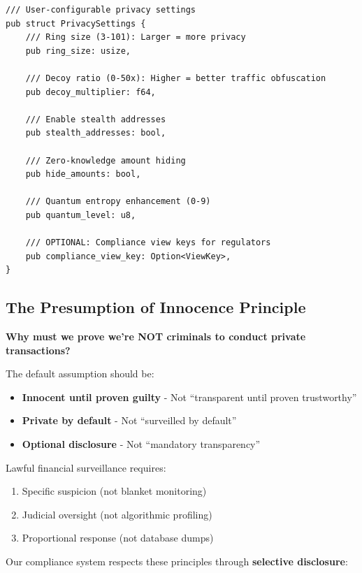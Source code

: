 \documentclass[12pt,a4paper]{article}
\begin{document}
\begin{lstlisting}[style=rustcode, caption=User-Controlled Privacy]
/// User-configurable privacy settings
pub struct PrivacySettings {
    /// Ring size (3-101): Larger = more privacy
    pub ring_size: usize,

    /// Decoy ratio (0-50x): Higher = better traffic obfuscation
    pub decoy_multiplier: f64,

    /// Enable stealth addresses
    pub stealth_addresses: bool,

    /// Zero-knowledge amount hiding
    pub hide_amounts: bool,

    /// Quantum entropy enhancement (0-9)
    pub quantum_level: u8,

    /// OPTIONAL: Compliance view keys for regulators
    pub compliance_view_key: Option<ViewKey>,
}
\end{lstlisting}

\subsection{The Presumption of Innocence Principle}

\textbf{Why must we prove we're NOT criminals to conduct private transactions?}

The default assumption should be:
\begin{itemize}
\item \textbf{Innocent until proven guilty} - Not ``transparent until proven trustworthy''
\item \textbf{Private by default} - Not ``surveilled by default''
\item \textbf{Optional disclosure} - Not ``mandatory transparency''
\end{itemize}

Lawful financial surveillance requires:
\begin{enumerate}
\item Specific suspicion (not blanket monitoring)
\item Judicial oversight (not algorithmic profiling)
\item Proportional response (not database dumps)
\end{enumerate}

Our compliance system respects these principles through \textbf{selective disclosure}:
\end{document}
